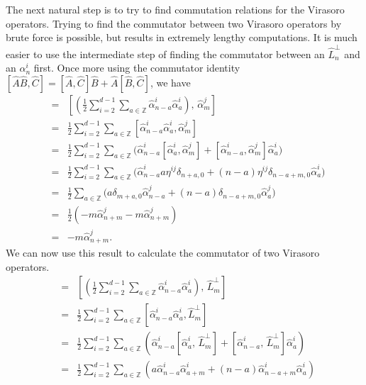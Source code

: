 \documentclass[a4paper,12pt]{article}
\numberwithin{equation}{section}
\begin{document}
The next natural step is to try to find commutation relations for the Virasoro operators. Trying to find the commutator between two Virasoro operators by brute force is possible, but results in extremely lengthy computations. It is much easier to use the intermediate step of finding the commutator between an $\hat{L}_n^\perp$ and an $\alpha_n^i$ first. Once more using the commutator identity $[\hat{A}\hat{B},\hat{C}]= [\hat{A},\hat{C}]\hat{B} + \hat{A}[\hat{B},\hat{C}]$, we have  
\begin{eqnarray*}
[\hat{L}_n^\perp,\,\hat{\alpha}_m^j] &=& \left[\left(\frac{1}{2}\sum_{i=2}^{d-1}\sum_{a\in\mathbb{Z}}\hat{\alpha}_{n-a}^i\hat{\alpha}_a^i\right),\,\hat{\alpha}_m^j\right]\\
&=& \frac{1}{2}\sum_{i=2}^{d-1}\sum_{a\in\mathbb{Z}}\left[\hat{\alpha}_{n-a}^i\hat{\alpha}_a^i,\hat{\alpha}_m^j\right]\\
&=& \frac{1}{2}\sum_{i=2}^{d-1}\sum_{a\in\mathbb{Z}}\Big(\hat{\alpha}_{n-a}^i\left[\hat{\alpha}_a^i,\hat{\alpha}_m^j\right] + \left[\hat{\alpha}_{n-a}^i,\hat{\alpha}_m^j\right]\hat{\alpha}_a^i\Big) \\
&=&\frac{1}{2}\sum_{i=2}^{d-1}\sum_{a\in\mathbb{Z}}\Big(\hat{\alpha}_{n-a}^i a \eta^{i j}\delta_{n+a,0} + (n-a)\eta^{ij}\delta_{n-a+m,0}\hat{\alpha}_a^i\Big)\\
&=&\frac{1}{2}\sum_{a\in\mathbb{Z}}\Big(a\delta_{m+a,0}\hat{\alpha}_{n-a}^j + (n-a)\delta_{n-a+m,0}\hat{\alpha}_a^j\Big)\\
&=&\frac{1}{2}(-m\hat{\alpha}_{n+m}^j-m\hat{\alpha}_{n+m}^j)\\
&=&-m\hat{\alpha}_{n+m}^j. 
\end{eqnarray*}
We can now use this result to calculate the commutator of two Virasoro operators.
\begin{eqnarray*}
[\hat{L}_n^\perp,\,\hat{L}_m^\perp] &=& \left[\left(\frac{1}{2}\sum_{i=2}^{d-1}\sum_{a\in\mathbb{Z}}\hat{\alpha}_{n-a}^i\hat{\alpha}_a^i\right),\,\hat{L}_m^\perp\right]\\
&=& \frac{1}{2}\sum_{i=2}^{d-1}\sum_{a\in\mathbb{Z}}\left[\hat{\alpha}_{n-a}^i\hat{\alpha}_a^i,\hat{L}_m^\perp\right]\\
&=&\frac{1}{2}\sum_{i=2}^{d-1}\sum_{a\in\mathbb{Z}}\left(\hat{\alpha}_{n-a}^i\left[\hat{\alpha}_a^i,\,\hat{L}_m^\perp\right] + \left[\hat{\alpha}_{n-a}^i,\,\hat{L}_m^\perp\right]\hat{\alpha}_a^i\right)\\
&=&\frac{1}{2}\sum_{i=2}^{d-1}\sum_{a\in\mathbb{Z}}\left(a\hat{\alpha}_{n-a}^i\hat{\alpha}_{a+m}^i + (n-a)\hat{\alpha}_{n-a+m}^i\hat{\alpha}_a^i\right)
\end{eqnarray*}
\end{document}

